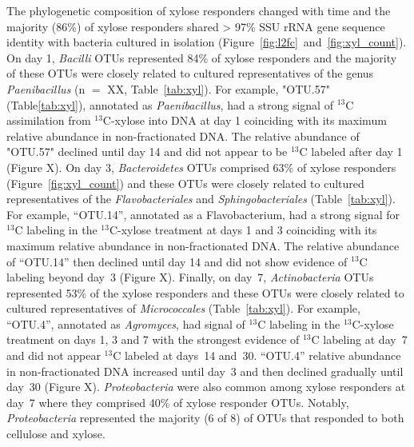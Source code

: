 The phylogenetic composition of xylose responders changed with time and the
majority (86\%) of xylose responders shared > 97\% SSU rRNA gene sequence
identity with bacteria cultured in isolation
(Figure~\ref{fig:l2fc}~and~\ref{fig:xyl_count}). On day 1, \textit{Bacilli}
OTUs represented 84\% of xylose responders and the majority of these OTUs were
closely related to cultured representatives of the genus \textit{Paenibacillus}
(n $=$ XX, Table~\ref{tab:xyl}). For example, "OTU.57" (Table\ref{tab:xyl}),
annotated as \textit{Paenibacillus}, had a strong signal of $^{13}$C
assimilation from $^{13}$C-xylose into DNA at day 1 coinciding with its maximum
relative abundance in non-fractionated DNA. The relative abundance of "OTU.57"
declined until day 14 and did not appear to be $^{13}$C labeled after day
1 (Figure X). On day 3, \textit{Bacteroidetes} OTUs comprised 63\% of xylose
responders (Figure~\ref{fig:xyl_count}) and these OTUs were closely related to
cultured representatives of the \textit{Flavobacteriales} and
\textit{Sphingobacteriales} (Table~\ref{tab:xyl}). For example, ``OTU.14'',
annotated as a Flavobacterium, had a strong signal for $^{13}$C labeling in the
$^{13}$C-xylose treatment at days 1 and 3 coinciding with its maximum relative
abundance in non-fractionated DNA. The relative abundance of ``OTU.14'' then
declined until day 14 and did not show evidence of $^{13}$C labeling beyond
day~3 (Figure X). Finally, on day~7, \textit{Actinobacteria} OTUs represented
53\% of the xylose responders and these OTUs were closely related to cultured
representatives of \textit{Micrococcales} (Table~\ref{tab:xyl}). For example,
``OTU.4'', annotated as \textit{Agromyces}, had signal of $^{13}$C labeling in
the $^{13}$C-xylose treatment on days 1, 3 and 7 with the strongest evidence of
$^{13}$C labeling at day~7 and did not appear $^{13}$C labeled at days~14
and~30. ``OTU.4'' relative abundance in non-fractionated DNA increased until
day~3 and then declined gradually until day~30 (Figure X).
\textit{Proteobacteria} were also common among xylose responders at day~7 where
they comprised 40\% of xylose responder OTUs. Notably, \textit{Proteobacteria}
represented the majority (6 of 8) of OTUs that responded to both cellulose and
xylose. 

